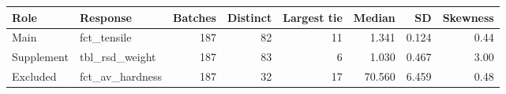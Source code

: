 \setlength{\tabcolsep}{2pt}\begin{tabular}{@{}llrrrrrr@{}}
\toprule
Role & Response & Batches & Distinct & Largest tie & Median & SD & Skewness\\
\midrule
Main & fct\_tensile & 187 & 82 & 11 & 1.341 & 0.124 & 0.44 \\
Supplement & tbl\_rsd\_weight & 187 & 83 & 6 & 1.030 & 0.467 & 3.00 \\
Excluded & fct\_av\_hardness & 187 & 32 & 17 & 70.560 & 6.459 & 0.48 \\
\bottomrule
\end{tabular}

